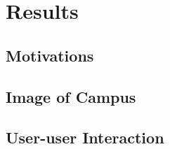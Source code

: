 \section{Results}
\subsection{Motivations}

\subsection{Image of Campus}

\subsection{User-user Interaction}